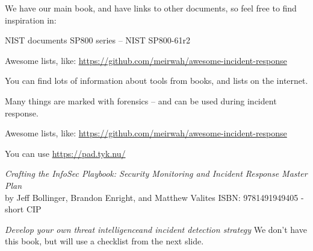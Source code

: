 \documentclass[Screen16to9,17pt]{foils}
\begin{document}
We have our main book, and have links to other documents, so feel free to find inspiration in:

\begin{list2}
\item NIST documents SP800 series -- NIST SP800-61r2
\item Awesome lists, like: \url{https://github.com/meirwah/awesome-incident-response}
\end{list2}








You can find lots of information about tools from books, and lists on the internet.

Many things are marked with forensics -- and can be used during incident response.

\begin{list2}
    \item Awesome lists, like: \url{https://github.com/meirwah/awesome-incident-response}

\end{list2}



You can use \url{https://pad.tyk.nu/}



\emph{Crafting the InfoSec Playbook: Security Monitoring and Incident Response Master Plan}\\
 by Jeff Bollinger, Brandon Enright, and Matthew Valites ISBN: 9781491949405 - short CIP

\emph{Develop your own threat intelligenceand incident detection strategy}
We don't have this book, but will use a checklist from the next slide.

\end{document}
